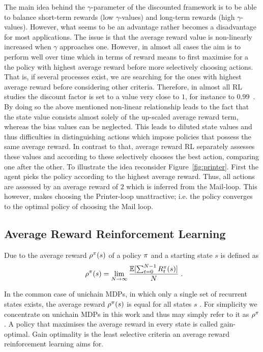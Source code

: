 \documentclass[envcountsame]{llncs}
\begin{document}
The main idea behind the \(\gamma\)-parameter of the discounted framework is to be able to balance
short-term rewards (low \(\gamma\)-values) and long-term rewards (high \(\gamma\)-values). However,
what seems to be an advantage rather becomes a disadvantage for most applications. The issue is that
the average reward value is non-linearly increased when \(\gamma\) approaches one. However, in
almost all cases the aim is to perform well over time which in terms of reward means to first
maximise for a the policy with highest average reward before more selectively choosing actions. That
is, if several processes exist, we are searching for the ones with highest average reward before
considering other criteria.
%
Therefore, in almost all RL studies the discount factor is set to a value very close to \(1\), for
instance to \(0.99\)~\cite[e.g.]{mnih2015human,mnih2016asynchronous,Lillicrap15}.
%
By doing so the above mentioned non-linear relationship leads to the fact that the state value
consists almost solely of the up-scaled average reward term, whereas the bias values can be
neglected. This leads to diluted state values and thus difficulties in distinguishing actions which
impose policies that possess the same average reward.
%
In contrast to that, average reward RL separately assesses these values and according to these
selectively chooses the best action, comparing one after the other.
%
To illustrate the idea reconsider Figure~\ref{fig:printer}. First the agent picks the policy
according to the highest average reward. Thus, all actions are assessed by an average reward of
\(2\) which is inferred from the Mail-loop. This however, makes choosing the Printer-loop
unattractive; i.e. the policy converges to the optimal policy of choosing the Mail loop.


\subsection{Average Reward Reinforcement Learning}
\label{subsec:Average_Reward_Reinforcement_Learning}

Due to \cite{Howard64} the average reward \(\rho^{\pi}(s)\) of a policy \(\pi\) and a starting
state \(s\) is defined as
\begin{align*}
  \avgrew^{\pol}(s) = \lim_{N \to \infty} \frac{\E [\sum_{t=0}^{N-1}R_{t}^{\pol}(s)]}{N}\tpkt
\end{align*}


In the common case of unichain MDPs, in which only a single set of recurrent states exists, the
average reward \(\rho^{\pi}(s)\) is equal for all states \(s\)
\citep{Mahadevan96_AverageRewardReinforcementLearningFoundationsAlgorithmsAndEmpiricalResults,Puterman94}.
For simplicity we concentrate on unichain MDPs in this work and thus may simply refer to it as
\(\rho^{\pi}\). A policy that maximises the average reward in every state is called
gain-optimal. Gain optimality is the least selective criteria an average reward reinforcement
learning aims for.
\end{document}

